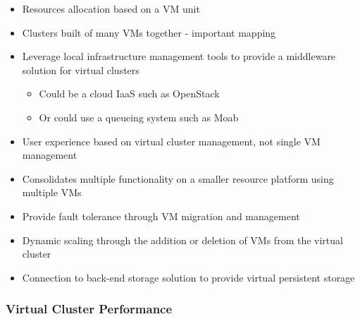 
\begin{itemize}
\item Resources allocation based on a VM unit
\item Clusters built of many VMs together - important mapping
\item Leverage local infrastructure management tools to provide a middleware solution for virtual clusters
	\begin{itemize}
	\item Could be a cloud IaaS such as OpenStack
	\item Or could use a queueing system such as Moab
	\end{itemize}
\item User experience based on virtual cluster management, not single VM management
\item Consolidates multiple functionality on a smaller resource platform using multiple VMs
\item Provide fault tolerance through VM migration and management
\item Dynamic scaling through the addition or deletion of VMs from the virtual cluster
\item Connection to back-end storage solution to provide virtual persistent storage
\end{itemize}



\subsubsection{Virtual Cluster Performance}


